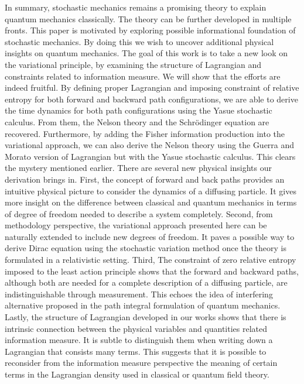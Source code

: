 \documentclass[%
 aip, 
 amsmath,amssymb,amsthm,
 nofootinbib,
 reprint,
]{revtex4-1}
\begin{document}
In summary, stochastic mechanics remains a promising theory to explain quantum mechanics classically. The theory can be further developed in multiple fronts. This paper is motivated by exploring possible informational foundation of stochastic mechanics. By doing this we wish to uncover additional physical insights on quantum mechanics. The goal of this work is to take a new look on the variational principle, by examining the structure of Lagrangian and constraints related to information measure. We will show that the efforts are indeed fruitful. By defining proper Lagrangian and imposing constraint of relative entropy for both forward and backward path configurations, we are able to derive the time dynamics for both path configurations using the Yasue stochastic calculus. From them, the Nelson theory and the Schr\"{o}dinger equation are recovered. Furthermore, by adding the Fisher information production into the variational approach, we can also derive the Nelson theory using the Guerra and Morato version of Lagrangian but with the Yasue stochastic calculus. This clears the mystery mentioned earlier. There are several new physical insights our derivation brings in. First, the concept of forward and back paths provides an intuitive physical picture to consider the dynamics of a diffusing particle. It gives more insight on the difference between classical and quantum mechanics in terms of degree of freedom needed to describe a system completely. Second, from methodology perspective, the variational approach presented here can be naturally extended to include new degrees of freedom. It paves a possible way to derive Dirac equation using the stochastic variation method once the theory is formulated in a relativistic setting. Third, The constraint of zero relative entropy imposed to the least action principle shows that the forward and backward paths, although both are needed for a complete description of a diffusing particle, are indistinguishable through measurement. This echoes the idea of interfering alternative proposed in the path integral formulation of quantum mechanics. Lastly, the structure of Lagrangian developed in our works shows that there is intrinsic connection between the physical variables and quantities related information measure. It is subtle to distinguish them when writing down a Lagrangian that consists many terms. This suggests that it is possible to reconsider from the information measure perspective the meaning of certain terms in the Lagrangian density used in classical or quantum field theory.
\end{document}
